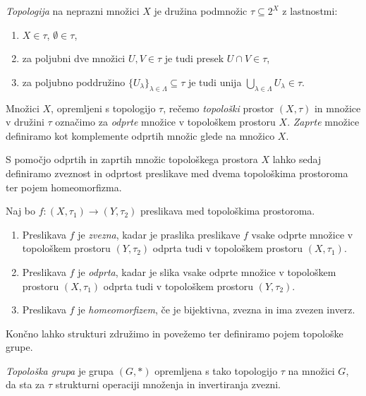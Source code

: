 \documentclass[mat1]{fmfdelo}
\begin{document}
\begin{definicija}\label{def:topologija}
\emph{Topologija} na neprazni množici $X$ je družina podmnožic $\tau \subseteq 2^X$ z lastnostmi:
\begin{enumerate}
\item $X \in \tau$, $\emptyset \in \tau$,
\item za poljubni dve množici $U,V \in \tau$ je tudi presek $U \cap V \in \tau$,
\item za poljubno poddružino $\lbrace U_{\lambda} \rbrace_{\lambda \in \Lambda} \subseteq \tau$ je tudi unija $\bigcup\limits_{\lambda \in \Lambda}^{} U_{\lambda} \in \tau$.
\end{enumerate}
Množici $X$, opremljeni s topologijo $\tau$, rečemo \emph{topološki} prostor $(X, \tau)$ in množice v družini $\tau$ označimo za \emph{odprte} množice v topološkem prostoru $X$. \emph{Zaprte} množice definiramo kot komplemente odprtih množic glede na množico $X$.
\end{definicija}

S pomočjo odprtih in zaprtih množic topološkega prostora $X$ lahko sedaj definiramo zveznost in odprtost preslikave med dvema topološkima prostoroma ter pojem homeomorfizma.

\begin{definicija}\label{def:toppreslikave}
Naj bo $f: (X, \tau_1) \to (Y, \tau_2)$ preslikava med topološkima prostoroma.
\begin{enumerate}
\item Preslikava $f$ je \emph{zvezna}, kadar je praslika preslikave $f$ vsake odprte množice v topološkem prostoru $(Y, \tau_2)$ odprta tudi v topološkem prostoru $(X, \tau_1)$.
\item Preslikava $f$ je \emph{odprta}, kadar je slika vsake odprte množice v topološkem prostoru $(X, \tau_1)$ odprta tudi v topološkem prostoru $(Y, \tau_2)$.
\item Preslikava $f$ je \emph{homeomorfizem}, če je bijektivna, zvezna in ima zvezen inverz.
\end{enumerate}
\end{definicija}

Končno lahko strukturi združimo in povežemo ter definiramo pojem topološke grupe.
\begin{definicija}\label{def:topgrupa}
\emph{Topološka grupa} je grupa $(G, *)$ opremljena s tako topologijo $\tau$ na množici $G$, da sta za $\tau$ strukturni operaciji množenja in invertiranja zvezni. 
\end{definicija}
\end{document}
